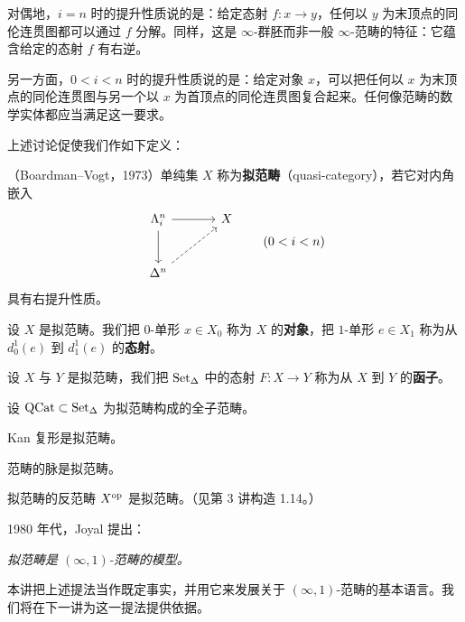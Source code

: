 \nitem\label{L4-1.4} 对偶地，$i=n$ 时的提升性质说的是：给定态射 $f\colon x\to y$，任何以 $y$ 为末顶点的同伦连贯图都可以通过 $f$ 分解。同样，这是 $\infty$-群胚而非一般 $\infty$-范畴的特征：它蕴含给定的态射 $f$ 有右逆。

\nitem\label{L4-1.5} 另一方面，$0<i<n$ 时的提升性质说的是：给定对象 $x$，可以把任何以 $x$ 为末顶点的同伦连贯图与另一个以 $x$ 为首顶点的同伦连贯图复合起来。任何像范畴的数学实体都应当满足这一要求。

\nitem\label{L4-1.6} 上述讨论促使我们作如下定义：

\begin{definition}\label{L4-1.7}
（Boardman--Vogt，1973）单纯集 $X$ 称为\textbf{拟范畴}（quasi-category），若它对内角嵌入
\[
\begin{tikzcd}[column sep=3.4em,row sep=2.6em]
\Lambda^n_i \arrow[r] \arrow[d] & X \\
\Delta^n \arrow[ur, dashed] &
\end{tikzcd}
\qquad (0<i<n)
\]
具有右提升性质。
\end{definition}


设 $X$ 是拟范畴。我们把 $0$-单形 $x\in X_0$ 称为 $X$ 的\textbf{对象}，把 $1$-单形 $e\in X_1$ 称为从 $d^1_0(e)$ 到 $d^1_1(e)$ 的\textbf{态射}。

设 $X$ 与 $Y$ 是拟范畴，我们把 $\operatorname{Set}_\Delta$ 中的态射 $F\colon X\to Y$ 称为从 $X$ 到 $Y$ 的\textbf{函子}。

设 $\mathrm{QCat}\subset\operatorname{Set}_\Delta$ 为拟范畴构成的全子范畴。

\begin{example}\label{L4-1.8}
Kan 复形是拟范畴。
\end{example}

\begin{exercise}\label{L4-1.9}
范畴的脉是拟范畴。
\end{exercise}

\begin{exercise}\label{L4-1.10}
拟范畴的反范畴 $X^{\mathrm{op}}$ 是拟范畴。（见第 3 讲构造 1.14。）
\end{exercise}

\nitem\label{L4-1.11} 1980 年代，Joyal 提出：
\begin{center}
\emph{拟范畴是 $(\infty,1)$-范畴的模型。}
\end{center}
本讲把上述提法当作既定事实，并用它来发展关于 $(\infty,1)$-范畴的基本语言。我们将在下一讲为这一提法提供依据。

